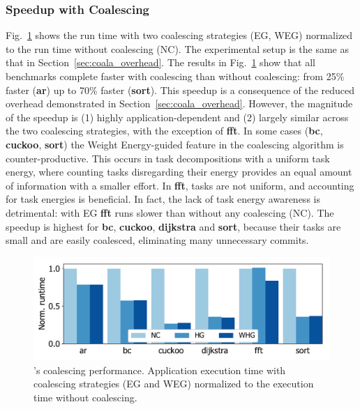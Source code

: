 \subsubsection{\sys Speedup with Coalescing}

Fig.~\ref{fig:coalescing} shows the \sys run time with two coalescing
strategies (EG, WEG) normalized to the run time without coalescing (NC).
%
The experimental setup is the same as that in Section~\ref{sec:coala_overhead}.
%
The results in Fig.~\ref{fig:coalescing} show that all benchmarks
complete faster with coalescing than without coalescing: from 25\% faster
(\textbf{ar}) up to 70\% faster (\textbf{sort}).
%
This speedup is a consequence of the reduced overhead demonstrated in
Section~\ref{sec:coala_overhead}.
%
However, the magnitude of the speedup is (1) highly application-dependent and
(2) largely similar across the two coalescing strategies, with the exception of
\textbf{fft}.
%
In some cases (\textbf{bc}, \textbf{cuckoo}, \textbf{sort}) the Weight Energy-guided
feature in the coalescing algorithm is counter-productive.
%
This occurs in task decompositions with a uniform task energy, where counting
tasks disregarding their energy provides an equal amount of information with a
smaller effort.
%
In \textbf{fft}, tasks are not uniform, and accounting for task energies is
beneficial. In fact, the lack of task energy awareness is detrimental: with EG
\textbf{fft} runs slower than without any coalescing (NC).
%
The speedup is highest for \textbf{bc}, \textbf{cuckoo}, \textbf{dijkstra} and
\textbf{sort}, because their tasks are small and are easily coalesced,
eliminating many unnecessary commits.
%
\begin{figure}
	\includegraphics[width=\columnwidth]{figures/coalStrategies}%
    \caption{\sys's coalescing performance.  Application execution time
with coalescing strategies (EG and WEG) normalized to the execution time
without coalescing.}
	\label{fig:coalescing}
\end{figure}

